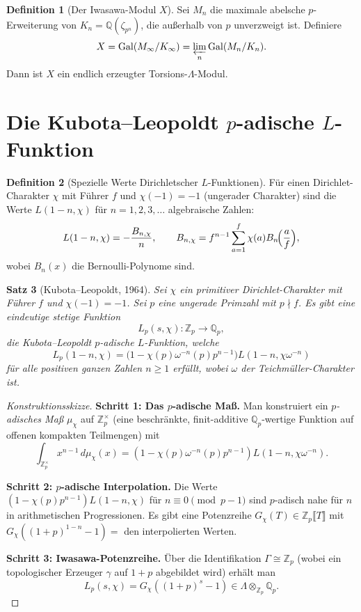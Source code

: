 \documentclass[12pt,a4paper]{amsart}
\newtheorem{theorem}{Satz}[section]
\theoremstyle{definition}
\newtheorem{definition}[theorem]{Definition}
\newcommand{\Q}{\mathbb{Q}}
\newcommand{\Zp}{\mathbb{Z}_p}
\newcommand{\Qp}{\mathbb{Q}_p}
\DeclareMathOperator{\Gal}{Gal}
\begin{document}
\begin{definition}[Der Iwasawa-Modul $X$]
Sei $M_n$ die maximale abelsche $p$-Erweiterung von $K_n = \Q(\zeta_{p^n})$,
die außerhalb von $p$ unverzweigt ist.  Definiere
\[
  X = \Gal(M_\infty / K_\infty)
  = \varprojlim_n \Gal(M_n/K_n).
\]
Dann ist $X$ ein endlich erzeugter Torsions-$\Lambda$-Modul.
\end{definition}

\section{Die Kubota--Leopoldt $p$-adische $L$-Funktion}

\begin{definition}[Spezielle Werte Dirichletscher $L$-Funktionen]
Für einen Dirichlet-Charakter $\chi$ mit Führer $f$ und $\chi(-1) = -1$
(ungerader Charakter) sind die Werte $L(1-n, \chi)$ für $n = 1, 2, 3, \ldots$
algebraische Zahlen:
\[
  L(1-n, \chi) = -\frac{B_{n,\chi}}{n},
  \qquad
  B_{n,\chi} = f^{n-1} \sum_{a=1}^{f} \chi(a) B_n\!\Bigl(\frac{a}{f}\Bigr),
\]
wobei $B_n(x)$ die Bernoulli-Polynome sind.
\end{definition}

\begin{theorem}[Kubota--Leopoldt, 1964]
\label{thm:kubota_leopoldt}
Sei $\chi$ ein primitiver Dirichlet-Charakter mit Führer $f$ und $\chi(-1) = -1$.
Sei $p$ eine ungerade Primzahl mit $p \nmid f$.
Es gibt eine eindeutige stetige Funktion
\[
  L_p(s, \chi) : \Zp \longrightarrow \Qp,
\]
die \emph{Kubota--Leopoldt $p$-adische $L$-Funktion}, welche
\[
  L_p(1-n, \chi) = \bigl(1 - \chi(p)\omega^{-n}(p) p^{n-1}\bigr)
                   L(1-n, \chi\omega^{-n})
\]
für alle positiven ganzen Zahlen $n \geq 1$ erfüllt,
wobei $\omega$ der Teichmüller-Charakter ist.
\end{theorem}

\begin{proof}[Konstruktionsskizze]
\textbf{Schritt 1: Das $p$-adische Maß.}
Man konstruiert ein \emph{$p$-adisches Maß} $\mu_\chi$ auf $\Zp^\times$
(eine beschränkte, finit-additive $\Qp$-wertige Funktion auf offenen
kompakten Teilmengen) mit
\[
  \int_{\Zp^\times} x^{n-1} \, d\mu_\chi(x)
  = (1 - \chi(p)\omega^{-n}(p)p^{n-1}) L(1-n, \chi\omega^{-n}).
\]

\textbf{Schritt 2: $p$-adische Interpolation.}
Die Werte $(1 - \chi(p)p^{n-1}) L(1-n, \chi)$ für $n \equiv 0 \pmod{p-1}$
sind $p$-adisch nahe für $n$ in arithmetischen Progressionen.
Es gibt eine Potenzreihe $G_\chi(T) \in \Zp\llbracket T \rrbracket$
mit $G_\chi((1+p)^{1-n} - 1) = $ den interpolierten Werten.

\textbf{Schritt 3: Iwasawa-Potenzreihe.}
Über die Identifikation $\Gamma \cong \Zp$ (wobei ein topologischer
Erzeuger $\gamma$ auf $1+p$ abgebildet wird) erhält man
\[
  L_p(s, \chi) = G_\chi((1+p)^s - 1) \in \Lambda \otimes_{\Zp} \Qp.
\]
\end{proof}
\end{document}
